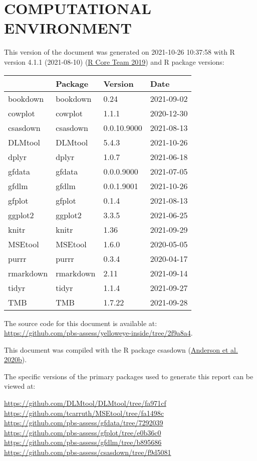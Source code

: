 \documentclass[11pt]{book}
\begin{document}
\hypertarget{computational-environment}{%
\section{COMPUTATIONAL ENVIRONMENT}\label{computational-environment}}

This version of the document was generated on 2021-10-26 10:37:58 with R version 4.1.1 (2021-08-10) (\protect\hyperlink{ref-r2019}{R Core Team 2019}) and R package versions:
\begin{longtable}[]{@{}llll@{}}
\toprule
& Package & Version & Date \\
\midrule
\endhead
bookdown & bookdown & 0.24 & 2021-09-02 \\
cowplot & cowplot & 1.1.1 & 2020-12-30 \\
csasdown & csasdown & 0.0.10.9000 & 2021-08-13 \\
DLMtool & DLMtool & 5.4.3 & 2021-10-26 \\
dplyr & dplyr & 1.0.7 & 2021-06-18 \\
gfdata & gfdata & 0.0.0.9000 & 2021-07-05 \\
gfdlm & gfdlm & 0.0.1.9001 & 2021-10-26 \\
gfplot & gfplot & 0.1.4 & 2021-08-13 \\
ggplot2 & ggplot2 & 3.3.5 & 2021-06-25 \\
knitr & knitr & 1.36 & 2021-09-29 \\
MSEtool & MSEtool & 1.6.0 & 2020-05-05 \\
purrr & purrr & 0.3.4 & 2020-04-17 \\
rmarkdown & rmarkdown & 2.11 & 2021-09-14 \\
tidyr & tidyr & 1.1.4 & 2021-09-27 \\
TMB & TMB & 1.7.22 & 2021-09-28 \\
\bottomrule
\end{longtable}
The source code for this document is available at:\\
\url{https://github.com/pbs-assess/yelloweye-inside/tree/2f9a8a4}.

This document was compiled with the R package csasdown (\protect\hyperlink{ref-csasdown}{Anderson et al. 2020b}).

The specific versions of the primary packages used to generate this report can be viewed at:

\url{https://github.com/DLMtool/DLMtool/tree/fa971cf}~\\
\url{https://github.com/tcarruth/MSEtool/tree/fa1498c}~\\
\url{https://github.com/pbs-assess/gfdata/tree/7292039}~\\
\url{https://github.com/pbs-assess/gfplot/tree/e0b36c0}~\\
\url{https://github.com/pbs-assess/gfdlm/tree/b895686}~\\
\url{https://github.com/pbs-assess/csasdown/tree/f9d5081}~\\
\end{document}
